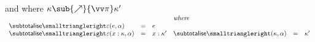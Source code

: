 \begin{figure}[H]
\flushleft
{}
and
where $\kappa \sub{\totalisefwdarrow}{\vec{\pi}} \kappa'$ \\

\small
$\begin{array}{lllllll}
&&&
\textit{where}
\\
\totaliseFwdF{\seqEmpty}(e,\alpha) &=& e
\\
\totaliseFwdF{\seqEmpty}(\elimVar{x}{\kappa},\alpha)
&=&
\elimVar{x}{\kappa'}
&
\totaliseFwdF{}(\kappa,\alpha) &=& \kappa'
\end{array}$ \\
\vspace{3mm}


\end{figure}
